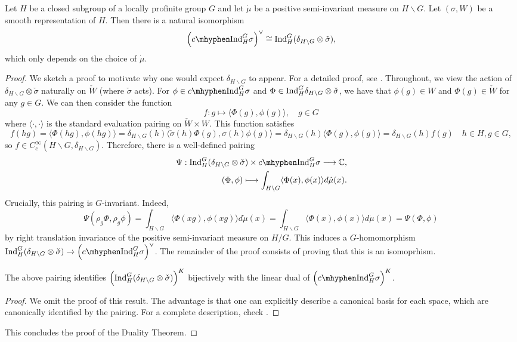 \begin{thm}\label{thm:duality}
    Let $H$ be a closed subgroup of a locally profinite group $G$ and let $\dot{\mu}$ be a positive semi-invariant measure on $H\backslash G$. Let $(\sigma,W)$ be a smooth representation of $H$. Then there is a natural isomorphism
    $$\left(\cInd_H^G\sigma \right)^\vee\cong \Ind_H^G(\delta_{H\backslash G}\otimes \check{\sigma}),$$
    which only depends on the choice of $\dot{\mu}$.
\end{thm}

\begin{proof}
    We sketch a proof to motivate why one would expect $\delta_{H\backslash G}$ to appear. For a detailed proof, see \cite[Theorem 3.5]{BH1}.
    Throughout, we view the action of $\delta_{H\backslash G}\otimes\check{\sigma}$ naturally on $\check{W}$ (where $\check{\sigma}$ acts). For $\phi\in \cInd_H^G\sigma$ and $\Phi\in\mathrm{Ind}_H^G\delta_{H\backslash G}\otimes\check{\sigma}$, 
    we have that $\phi(g)\in W$ and $\Phi(g)\in\check{W}$ for any $g\in G$. We can then consider the function $$f:g\longmapsto\langle\Phi(g),\phi(g)\rangle,\quad g\in G $$ 
    where $\langle\cdot,\cdot\rangle$ is the standard evaluation pairing on $\check{W}\times W$. This function satisfies 
    $$f(hg)=\langle\Phi(hg),\phi(hg)\rangle=\delta_{H\backslash G}(h)\langle\check{\sigma}(h)\Phi(g),\sigma(h)\phi(g)\rangle=\delta_{H\backslash G}(h)\langle\Phi(g),\phi(g)\rangle=\delta_{H\backslash G}(h)f(g)\quad h\in H, g\in G,$$
    so $f\in C_c^\infty(H\backslash G,\delta_{H\backslash G})$.
    Therefore, there is a well-defined pairing 
    \begin{align*}
        \Psi:\Ind_H^G(\delta_{H\backslash G}\otimes\check{\sigma})\times \cInd_H^G\sigma\longrightarrow\CC&,\\
        (\Phi,\phi)\longmapsto\int_{H\backslash G}\langle\Phi(x),\phi(x)\rangle d\dot{\mu}(x)&.
    \end{align*}
    Crucially, this pairing is $G$-invariant. Indeed, 
    $$\Psi(\rho_g\Phi,\rho_g\phi)=\int_{H\backslash G}\langle\Phi(xg),\phi(xg)\rangle d\dot{\mu}(x)=\int_{H\backslash G}\langle\Phi(x),\phi(x)\rangle d\dot{\mu}(x)=\Psi(\Phi,\phi)$$
    by right translation invariance of the positive semi-invariant measure on $H/G$. 
    This induces a $G$-homomorphism $\Ind_H^G(\delta_{H\backslash G}\otimes \check{\sigma})\to \left(\cInd_H^G\sigma \right)^\vee$. The remainder of the proof consists of proving that this is an isomoprhism.

    \begin{lemma}
        The above pairing identifies $\left(\mathrm{Ind}_H^G(\delta_{H\backslash G}\otimes \check{\sigma})\right)^K$ bijectively with the linear dual of $\left(\cInd_H^G\sigma \right)^K$.
    \end{lemma}
    \begin{proof}
        We omit the proof of this result. The advantage is that one can explicitly describe a canonical basis for each space, which are canonically identified by the pairing. For a complete description, check \cite[Lemma 3.5.2]{BH1}.
    \end{proof}
    This concludes the proof of the Duality Theorem.
\end{proof}

